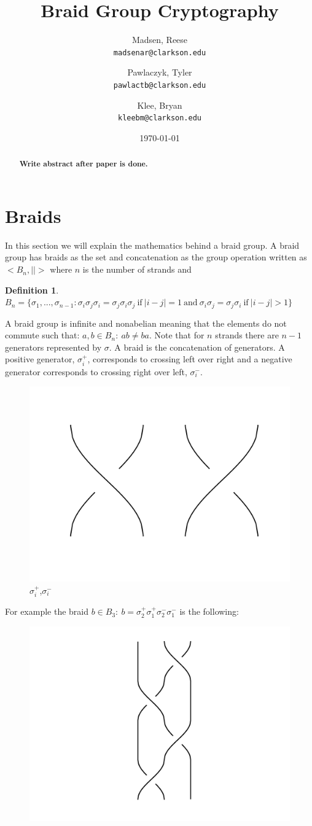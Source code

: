 \documentclass{article}
\title{Braid Group Cryptography}
\author{
  Madsen, Reese\\
  \texttt{madsenar@clarkson.edu}
  \and
  Pawlaczyk, Tyler\\
  \texttt{pawlactb@clarkson.edu}
   \and
  Klee, Bryan\\
  \texttt{kleebm@clarkson.edu}
}
\date{\today}
\theoremstyle{definition}
\newtheorem{definition}{Definition}[section]
\begin{document}
	\maketitle

	\begin{abstract}
	\textbf{Write abstract after paper is done.}
	\end{abstract}
	\newpage
	\section{Braids}
	In this section we will explain the mathematics behind a braid group. A braid group has braids as the set and concatenation as the group operation written as $<B_n,||>$ where $n$ is the number of strands and 

\begin{definition} 
$B_n=\{\sigma_1,...,\sigma_{n-1}:\sigma_i\sigma_j\sigma_i=\sigma_j\sigma_i\sigma_j\ \textrm{if}\ |i-j|=1\ \textrm{and}\ \sigma_i\sigma_j=\sigma_j\sigma_i\ \textrm{if}\ |i-j|>1\}$
\end{definition}
 
A braid group is infinite and nonabelian meaning that the elements do not commute such that:
$a,b \in B_n: \ ab\neq ba$. Note that for $n$ strands there are $n-1$ generators represented by $\sigma$. A braid is the concatenation of generators. A positive generator, $\sigma_i^+$, corresponds to crossing left over right and a negative generator corresponds to crossing right over left, $\sigma_i^-$. 

\begin{figure}[hbp!]
\centering
  \includegraphics[width=0.2\linewidth]{./Pictures/gen_pos_neg.png}
  \caption{$\sigma_i^+$,$\sigma_i^-$}\label{fig:graph}
\end{figure}


For example the braid $b \in B_3: \ b=\sigma_2^+ \sigma_1^+ \sigma_2^- \sigma_1^-$ is the following:
	
	\begin{figure}[hbp!]
\centering
  \includegraphics[width=0.2\linewidth]{./Pictures/example_braid.png}
\end{figure}
	
\end{document}

